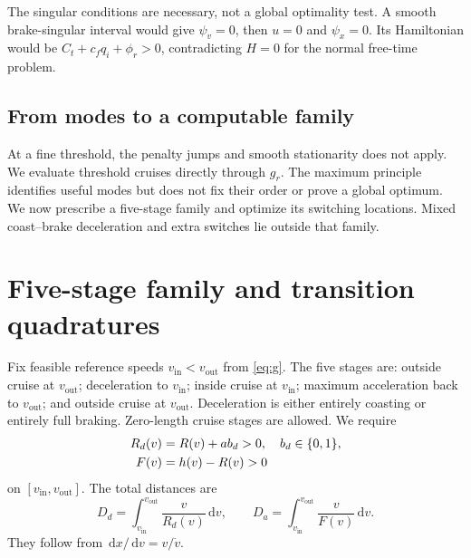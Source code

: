 \documentclass[conference,a4paper]{IEEEtran}
\newcommand{\dd}{\,\mathrm{d}}
\newcommand{\out}{\mathrm{out}}
\newcommand{\inn}{\mathrm{in}}
\begin{document}
The singular conditions are necessary, not a global optimality test. A smooth brake-singular interval would give $\psi_v=0$, then $u=0$ and $\psi_x=0$. Its Hamiltonian would be $C_t+c_fq_i+\phi_r>0$, contradicting $H=0$ for the normal free-time problem.

\subsection{From modes to a computable family}
At a fine threshold, the penalty jumps and smooth stationarity does not apply. We evaluate threshold cruises directly through $g_r$. The maximum principle identifies useful modes but does not fix their order or prove a global optimum. We now prescribe a five-stage family and optimize its switching locations. Mixed coast--brake deceleration and extra switches lie outside that family.

\section{Five-stage family and transition quadratures}
\label{sec:family}
Fix feasible reference speeds $v_{\inn}<v_{\out}$ from \eqref{eq:g}. The five stages are: outside cruise at $v_{\out}$; deceleration to $v_{\inn}$; inside cruise at $v_{\inn}$; maximum acceleration back to $v_{\out}$; and outside cruise at $v_{\out}$. Deceleration is either entirely coasting or entirely full braking. Zero-length cruise stages are allowed. We require
\begin{align}
R_d(v)&=R(v)+ab_d>0,\quad b_d\in\{0,1\},\notag\\
F(v)&=h(v)-R(v)>0
\label{eq:denominators}
\end{align}
on $[v_{\inn},v_{\out}]$. The total distances are
\begin{equation}
D_d=\int_{v_{\inn}}^{v_{\out}}\frac{v}{R_d(v)}\dd v,
\qquad
D_a=\int_{v_{\inn}}^{v_{\out}}\frac{v}{F(v)}\dd v.
\end{equation}
They follow from $\dd x/\dd v=v/\dot v$.
\end{document}
